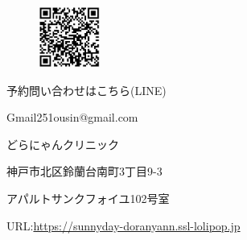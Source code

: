 \documentclass{jsarticle}
\begin{document}
	\vspace{100pt}
	\begin{figure}
		\vspace*{-\intextsep}
		\hspace{-60pt}
		\includegraphics[width=2cm]{qr.jpg}
	\end{figure}
	予約問い合わせはこちら(LINE)

	Gmail\hspace{8pt}251ousin@gmail.com

	\vspace{50pt}
	\huge
	どらにゃんクリニック
\Large

	神戸市北区鈴蘭台南町3丁目9-3

	アパルトサンクフォイユ102号室

	URL:\url{https://sunnyday-doranyann.ssl-lolipop.jp}
\end{document}
